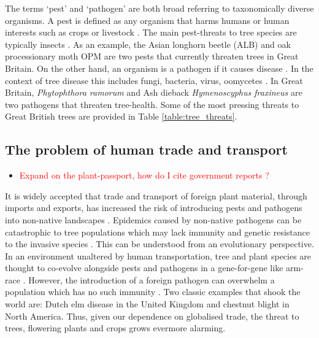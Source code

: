The terms `pest' and `pathogen' are both broad referring to taxonomically diverse organisms. A pest is defined as any organism that harms humans or human interests such as crops or livestock \cite{oerke2006crop, de1964biological, buckle2015rodent}. The main pest-threats to tree species are typically insects \cite{metcalf1994introduction}. As an example, the Asian longhorn beetle (ALB) \cite{haack2010managing} and oak processionary moth OPM \cite{tomlinson2015managing} are two pests that currently threaten trees in Great Britain. On the other hand, an organism is a pathogen if it causes disease \cite{balloux2017q}. In the context of tree disease this includes fungi, bacteria, virus, oomycetes \cite{Boyd1235773}. In Great Britain, \textit{Phytophthora ramorum} \cite{brasier2005phytophthora} and Ash dieback \textit{Hymenoscyphus fraxineus} \cite{mitchell2014ash, ash-dieback-costs} are two pathogens that threaten tree-health. Some of the most pressing threats to Great British trees are provided in Table \ref{table:tree_threats}.\\

\subsection{The problem of human trade and transport}
\begin{itemize}
    \item \textcolor{red}{Expand on the plant-passport, how do I cite government reports ?}
\end{itemize}
It is widely accepted that trade and transport of foreign plant material, through imports and exports, has increased the risk of introducing pests and pathogens into non-native landscapes \cite{POTTER201761, lovett2016nonnative, roy2014increasing}. Epidemics caused by non-native pathogens can be catastrophic to tree populations which may lack immunity and genetic resistance to the invasive species \cite{doi:10.1002/9781444329988.ch8}. This can be understood from an evolutionary perspective. In an environment unaltered by human transportation, tree and plant species are thought to co-evolve alongside pests and pathogens in a gene-for-gene like arm-race \cite{flor1971current, dangl2001plant, Thrall1735}. However, the introduction of a foreign pathogen can overwhelm a population which has no such immunity \cite{desprez2016evolutionary}. Two classic examples that shook the world are: Dutch elm disease \cite{doi:10.1111/j.1365-3059.2010.02391.x} in the United Kingdom and chestnut blight \cite{doi:10.1002/9780470535486.ch7} in North America. Thus, given our dependence on globalised trade, the threat to trees, flowering plants and crops grows evermore alarming.\\ 

